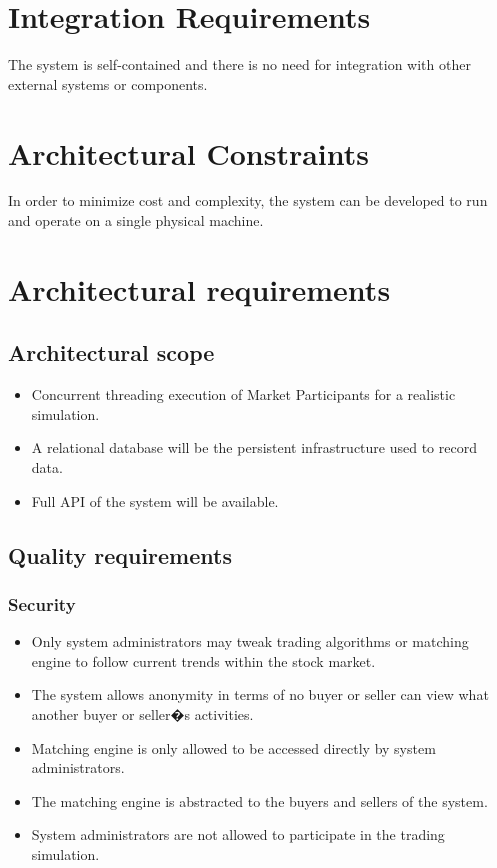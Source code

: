 \documentclass[12pt]{article}
\begin{document}
		\section{Integration Requirements}
		The system is self-contained and there is no need for integration with other external systems or components.
		\section{Architectural Constraints}
		In order to minimize cost and complexity, the system can be developed to run and operate on a single physical machine. 
	
        \newpage
                \section{Architectural requirements}	    
			    \subsection{Architectural scope}	

                                \begin{itemize}
                                     \item Concurrent threading execution of Market Participants for a realistic simulation.
                                     \item A relational database will be the persistent infrastructure used to record data.
                                     \item Full API of the system will be available.
                                 \end{itemize}

			    \subsection{Quality requirements}	
			    	\subsubsection{Security}
			    	\begin{itemize}
			    		\item Only system administrators may tweak trading algorithms or matching engine to follow current trends within the stock market.
                                        \item The system allows anonymity in terms of no buyer or seller can view what another buyer or seller�s activities.
                                        \item Matching engine is only allowed to be accessed directly by system administrators. 
                                        \item The matching engine is abstracted to the buyers and sellers of the system. 
                                        \item System administrators are not allowed to participate in the trading simulation.
			    	\end{itemize}	
			    		
\end{document}
